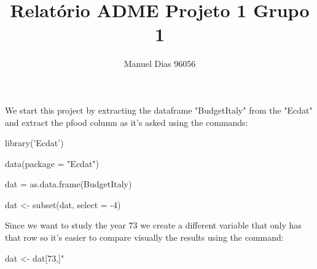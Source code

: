 \documentclass{article}
\title{Relatório ADME Projeto 1 Grupo 1}
\author{Manuel Dias 96056}
\begin{document}
    \maketitle
    \newpage
    We start this project by extracting the dataframe "BudgetItaly" from the "Ecdat" and extract the pfood column as it's asked using the commands:

    library('Ecdat')

    data(package = "Ecdat")

    dat = as.data.frame(BudgetItaly)

    dat <- subset(dat, select = -4)

    Since we want to study the year 73 we create a different variable that only has that row so it's easier to compare visually the results using the command:

    dat <- dat[73,]"
\end{document}
